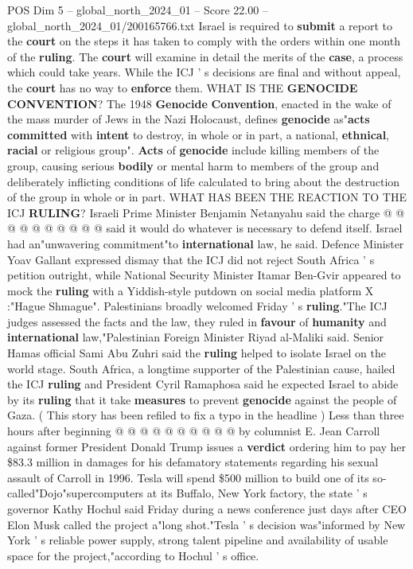 \begin{textsample}{POS Dim 5 – global\_north\_2024\_01 – Score 22.00 – global\_north\_2024\_01/200165766.txt}
Israel is required to \textbf{submit} a report to the \textbf{court} on the steps it has taken to comply with the orders within one month of the \textbf{ruling}.
The \textbf{court} will examine in detail the merits of the \textbf{case}, a process which could take years.
While the ICJ ' s decisions are final and without appeal, the \textbf{court} has no way to \textbf{enforce} them.
WHAT IS THE \textbf{GENOCIDE} \textbf{CONVENTION}?
The 1948 \textbf{Genocide} \textbf{Convention}, enacted in the wake of the mass murder of Jews in the Nazi Holocaust, defines \textbf{genocide} as"\textbf{acts} \textbf{committed} with \textbf{intent} to destroy, in whole or in part, a national, \textbf{ethnical}, \textbf{racial} or religious group". \textbf{Acts} of \textbf{genocide} include killing members of the group, causing serious \textbf{bodily} or mental harm to members of the group and deliberately inflicting conditions of life calculated to bring about the destruction of the group in whole or in part.
WHAT HAS BEEN THE REACTION TO THE ICJ \textbf{RULING}?
Israeli Prime Minister Benjamin Netanyahu said the charge @ @ @ @ @ @ @ @ @ @ said it would do whatever is necessary to defend itself.
Israel had an"unwavering commitment"to \textbf{international} law, he said.
Defence Minister Yoav Gallant expressed dismay that the ICJ did not reject South Africa ' s petition outright, while National Security Minister Itamar Ben-Gvir appeared to mock the \textbf{ruling} with a Yiddish-style putdown on social media platform X :"Hague Shmague".
Palestinians broadly welcomed Friday ' s \textbf{ruling}."The ICJ judges assessed the facts and the law, they ruled in \textbf{favour} of \textbf{humanity} and \textbf{international} law,"Palestinian Foreign Minister Riyad al-Maliki said.
Senior Hamas official Sami Abu Zuhri said the \textbf{ruling} helped to isolate Israel on the world stage.
South Africa, a longtime supporter of the Palestinian cause, hailed the ICJ \textbf{ruling} and President Cyril Ramaphosa said he expected Israel to abide by its \textbf{ruling} that it take \textbf{measures} to prevent \textbf{genocide} against the people of Gaza. ( This story has been refiled to fix a typo in the headline ) Less than three hours after beginning @ @ @ @ @ @ @ @ @ @ by columnist E.
Jean Carroll against former President Donald Trump issues a \textbf{verdict} ordering him to pay her \$83.3 million in damages for his defamatory statements regarding his sexual assault of Carroll in 1996.
Tesla will spend \$500 million to build one of its so-called"Dojo"supercomputers at its Buffalo, New York factory, the state ' s governor Kathy Hochul said Friday during a news conference just days after CEO Elon Musk called the project a"long shot."Tesla ' s decision was"informed by New York ' s reliable power supply, strong talent pipeline and availability of usable space for the project,"according to Hochul ' s office.

\end{textsample}
